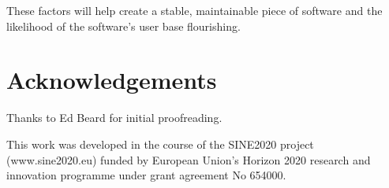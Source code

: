 \documentclass[jnr]{iosart2x}
\begin{document}
These factors will help create a stable, maintainable piece of software and the likelihood of the software's user base flourishing.

\section{Acknowledgements}
\label{Acknowledgements}

Thanks to Ed Beard for initial proofreading.

This work was developed in the course of the SINE2020 project (www.sine2020.eu) funded by European Union’s Horizon 2020 research and innovation programme under grant agreement No 654000.



\nocite{*}


\end{document}
